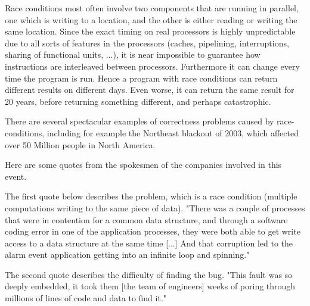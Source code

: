 \begin{cluster}
\label{grp:grm:language::functional-algorithms::race}

\begin{gram}
\label{grm:language::functional-algorithms::race}
Race conditions most often involve two components that are running
in parallel, one which is writing to a location, and the other is
either reading or writing the same location.     Since the exact timing on
real processors is highly unpredictable due to all sorts of features
in the processors (caches, pipelining, interruptions, sharing of
functional units, ...),   it is near impossible to guarantee how
instructions are interleaved between processors.     Furthermore it
can change every time the program is run.   Hence a program with race
conditions can return different results on different days.  Even
worse, it can return the same result for 20 years, before returning
something different, and perhaps catastrophic.

\end{gram}
\end{cluster}

\begin{cluster}
\label{grp:xmpl:language::functional-algorithms::spectacular}

\begin{example}
\label{xmpl:language::functional-algorithms::spectacular}
There are several spectacular examples of correctness problems caused
by race-conditions, including for example the Northeast blackout of
2003, which affected over 50 Million people in North America.

Here are some quotes from the spokesmen of the companies involved in
this event.

The first quote below describes the problem, which is a race
condition (multiple computations writing to the same piece of data).
"There was a couple of processes that were in contention for a common
data structure, and through a software coding error in one of the
application processes, they were both able to get write access to a
data structure at the same time [...] And that corruption led to the
alarm event application getting into an infinite loop and spinning."

The second  quote describes the difficulty of finding the bug.
"This fault was so deeply embedded, it took them [the team of
  engineers] weeks of poring through millions of lines of code and
data to find it."

\end{example}
\end{cluster}

